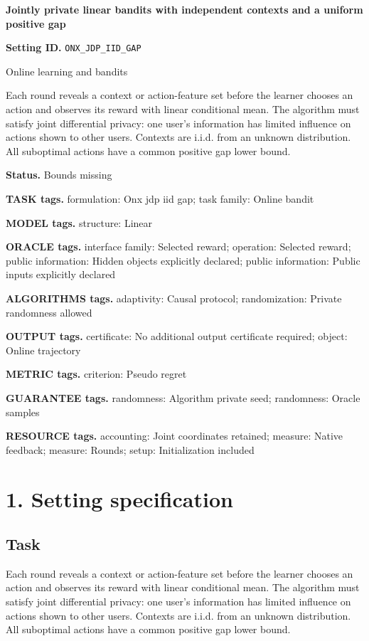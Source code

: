 \documentclass[10pt,a4paper]{article}
\begin{document}
\raggedright

{\LARGE\bfseries\sffamily\color{AtlasNavy} Jointly private linear bandits with independent contexts and a uniform positive gap\par}\vspace{5pt}
\textbf{Setting ID.} \texttt{ONX\_\allowbreak{}JDP\_\allowbreak{}IID\_\allowbreak{}GAP}

Online learning and bandits

Each round reveals a context or action-feature set before the learner chooses an action and observes its reward with linear conditional mean. The algorithm must satisfy joint differential privacy: one user's information has limited influence on actions shown to other users. Contexts are i.i.d. from an unknown distribution. All suboptimal actions have a common positive gap lower bound.

\textbf{Status.} Bounds missing

\textbf{TASK tags.} formulation: Onx jdp iid gap; task family: Online bandit

\textbf{MODEL tags.} structure: Linear

\textbf{ORACLE tags.} interface family: Selected reward; operation: Selected reward; public information: Hidden objects explicitly declared; public information: Public inputs explicitly declared

\textbf{ALGORITHMS tags.} adaptivity: Causal protocol; randomization: Private randomness allowed

\textbf{OUTPUT tags.} certificate: No additional output certificate required; object: Online trajectory

\textbf{METRIC tags.} criterion: Pseudo regret

\textbf{GUARANTEE tags.} randomness: Algorithm private seed; randomness: Oracle samples

\textbf{RESOURCE tags.} accounting: Joint coordinates retained; measure: Native feedback; measure: Rounds; setup: Initialization included

\section{1. Setting specification}
\subsection{Task}
Each round reveals a context or action-feature set before the learner chooses an action and observes its reward with linear conditional mean. The algorithm must satisfy joint differential privacy: one user's information has limited influence on actions shown to other users. Contexts are i.i.d. from an unknown distribution. All suboptimal actions have a common positive gap lower bound.
\end{document}
